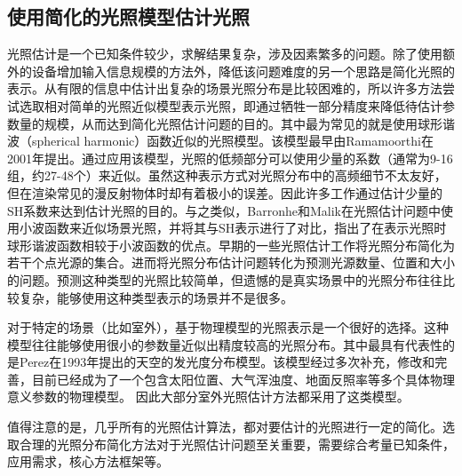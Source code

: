 \subsection{使用简化的光照模型估计光照}
光照估计是一个已知条件较少，求解结果复杂，涉及因素繁多的问题。除了使用额外的设备增加输入信息规模的方法外，降低该问题难度的另一个思路是简化光照的表示。从有限的信息中估计出复杂的场景光照分布是比较困难的，所以许多方法尝试选取相对简单的光照近似模型表示光照，即通过牺牲一部分精度来降低待估计参数量的规模，从而达到简化光照估计问题的目的。其中最为常见的就是使用球形谐波（spherical harmonic）函数近似的光照模型。该模型最早由Ramamoorthi\cite{ramamoorthi2001efficient}在2001年提出。通过应用该模型，光照的低频部分可以使用少量的系数（通常为9-16组，约27-48个）来近似。虽然这种表示方式对光照分布中的高频细节不太友好，但在渲染常见的漫反射物体时却有着极小的误差。因此许多工作\cite{ramamoorthi2001signal,kemelmacher20113d,garrido2013reconstructing,knorr2014real,li2014intrinsic,barron2015shape}通过估计少量的SH系数来达到估计光照的目的。与之类似，Barronhe和Malik\cite{okabe2004spherical}在光照估计问题中使用小波函数来近似场景光照，并将其与SH表示进行了对比，指出了在表示光照时球形谐波函数相较于小波函数的优点。早期的一些光照估计工作\cite{sato1999acquiring,  panagopoulos2011illumination, wang2002estimation, li2003multiple, sato2003illumination}将光照分布简化为若干个点光源的集合。进而将光照分布估计问题转化为预测光源数量、位置和大小的问题。预测这种类型的光照比较简单，但遗憾的是真实场景中的光照分布往往比较复杂，能够使用这种类型表示的场景并不是很多。

对于特定的场景（比如室外），基于物理模型的光照表示是一个很好的选择。这种模型往往能够使用很小的参数量近似出精度较高的光照分布。其中最具有代表性的是Perez\cite{perez1993all}在1993年提出的天空的发光度分布模型。该模型经过多次补充，修改和完善\cite{nishita1996display, sirai1993display,preetham1999practical,raab2008unbiased,hosek2012analytic, hovsekhovsek2013adding}，目前已经成为了一个包含太阳位置、大气浑浊度、地面反照率等多个具体物理意义参数的物理模型。
因此大部分室外光照估计方法\cite{lalonde2008does, lalonde2010sun, lalonde2012estimating, sunkavalli2008color}都采用了这类模型。

值得注意的是，几乎所有的光照估计算法，都对要估计的光照进行一定的简化。选取合理的光照分布简化方法对于光照估计问题至关重要，需要综合考量已知条件，应用需求，核心方法框架等。


